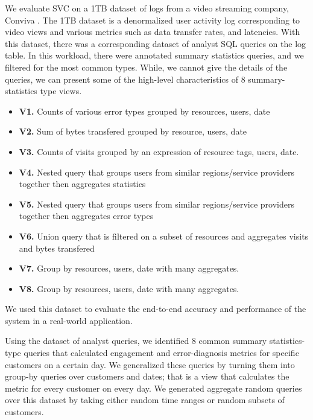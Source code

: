 We evaluate SVC on a 1TB dataset of logs from a video streaming company, Conviva \cite{conviva}.
The 1TB dataset is a denormalized user activity log corresponding to video views and various metrics such as data transfer rates, and latencies.
With this dataset, there was a corresponding dataset of analyst SQL queries on the log table.
In this workload, there were annotated summary statistics queries, and we filtered for the most common types.
While, we cannot give the details of the queries, we can present some of the high-level characteristics of 8 summary-statistics type views. 
\begin{itemize} 
\item \textbf{V1.} Counts of various error types grouped by resources, users, date
\item \textbf{V2.} Sum of bytes transfered grouped by resource, users, date
\item \textbf{V3.} Counts of visits grouped by an expression of resource tags, users, date.
\item \textbf{V4.} Nested query that groups users from similar regions/service providers together then aggregates statistics
\item \textbf{V5.} Nested query that groups users from similar regions/service providers together then aggregates error types
\item \textbf{V6.} Union query that is filtered on a subset of resources and aggregates visits and bytes transfered
\item \textbf{V7.} Group by resources, users, date with many aggregates.
\item \textbf{V8.} Group by resources, users, date with many aggregates.
\end{itemize}
We used this dataset to evaluate the end-to-end accuracy and performance of the system in a real-world application.

Using the dataset of analyst queries, we identified 8 common summary statistics-type queries that calculated engagement and error-diagnosis metrics for specific customers on a certain day.
We generalized these queries by turning them into group-by queries over customers and dates; that is a view that calculates the metric for every customer on every day.
We generated aggregate random queries over this dataset by taking either random time ranges or random subsets of customers.

